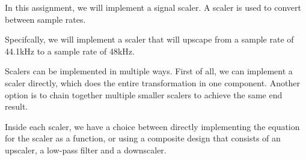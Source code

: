 
In this assignment, we will implement a signal scaler.
A scaler is used to convert between sample rates.

Specifcally, we will implement a scaler that will upscape from a sample rate of 44.1kHz to a sample rate of 48kHz.

Scalers can be implemented in multiple ways.
First of all, we can implement a scaler directly, which does the entire transformation in one component.
Another option is to chain together multiple smaller scalers to achieve the same end result.

Inside each scaler, we have a choice between directly implementing the equation for the scaler as a function, or using a composite design that consists of an upscaler, a low-pass filter and a downscaler.
